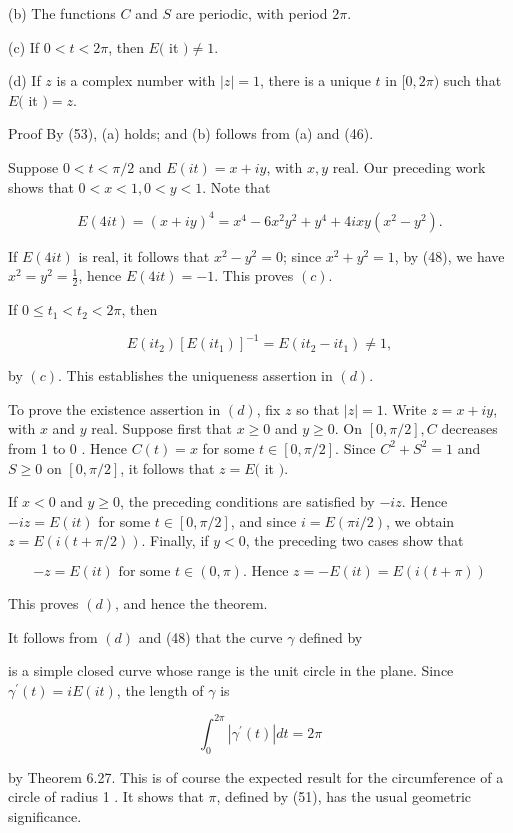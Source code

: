 \documentclass[10pt]{article}
\begin{document}
(b) The functions $C$ and $S$ are periodic, with period $2 \pi$.

(c) If $0<t<2 \pi$, then $E($ it $) \neq 1$.

(d) If $z$ is a complex number with $|z|=1$, there is a unique $t$ in $[0,2 \pi)$ such that $E($ it $)=z$.

Proof By (53), (a) holds; and (b) follows from (a) and (46).

Suppose $0<t<\pi / 2$ and $E(i t)=x+i y$, with $x, y$ real. Our preceding work shows that $0<x<1,0<y<1$. Note that

$$
E(4 i t)=(x+i y)^{4}=x^{4}-6 x^{2} y^{2}+y^{4}+4 i x y\left(x^{2}-y^{2}\right) .
$$

If $E(4 i t)$ is real, it follows that $x^{2}-y^{2}=0$; since $x^{2}+y^{2}=1$, by (48), we have $x^{2}=y^{2}=\frac{1}{2}$, hence $E(4 i t)=-1$. This proves $(c)$.

If $0 \leq t_{1}<t_{2}<2 \pi$, then

$$
E\left(i t_{2}\right)\left[E\left(i t_{1}\right)\right]^{-1}=E\left(i t_{2}-i t_{1}\right) \neq 1,
$$

by $(c)$. This establishes the uniqueness assertion in $(d)$.

To prove the existence assertion in $(d)$, fix $z$ so that $|z|=1$. Write $z=x+i y$, with $x$ and $y$ real. Suppose first that $x \geq 0$ and $y \geq 0$. On $[0, \pi / 2], C$ decreases from 1 to 0 . Hence $C(t)=x$ for some $t \in[0, \pi / 2]$. Since $C^{2}+S^{2}=1$ and $S \geq 0$ on $[0, \pi / 2]$, it follows that $z=E($ it $)$.

If $x<0$ and $y \geq 0$, the preceding conditions are satisfied by $-i z$. Hence $-i z=E(i t)$ for some $t \in[0, \pi / 2]$, and since $i=E(\pi i / 2)$, we obtain $z=E(i(t+\pi / 2))$. Finally, if $y<0$, the preceding two cases show that

$$
-z=E(i t) \text { for some } t \in(0, \pi) \text {. Hence } z=-E(i t)=E(i(t+\pi))
$$

This proves $(d)$, and hence the theorem.

It follows from $(d)$ and (48) that the curve $\gamma$ defined by

is a simple closed curve whose range is the unit circle in the plane. Since $\gamma^{\prime}(t)=i E(i t)$, the length of $\gamma$ is

$$
\int_{0}^{2 \pi}\left|\gamma^{\prime}(t)\right| d t=2 \pi
$$

by Theorem 6.27. This is of course the expected result for the circumference of a circle of radius 1 . It shows that $\pi$, defined by (51), has the usual geometric significance.
\end{document}
